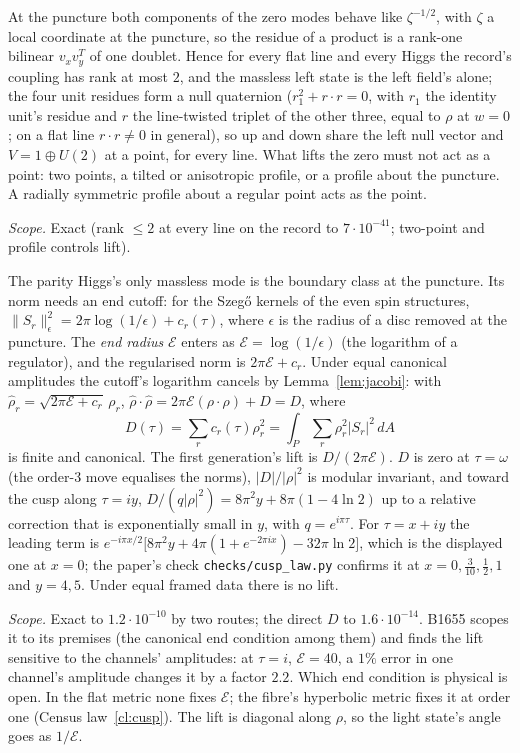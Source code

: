 \begin{proposition}\label{prop:rank}
At the puncture both components of the zero modes behave like $\zeta^{-1/2}$, with $\zeta$ a local coordinate at the puncture, so the residue of a product is a rank-one
bilinear $v_xv_y^T$ of one doublet. Hence for every flat line and every Higgs the record's coupling has rank at most $2$,
and the massless left state is the left field's alone; the four unit residues form a null quaternion
($r_1^2+r\cdot r=0$, with $r_1$ the identity unit's residue and $r$ the line-twisted triplet of the other three, equal to
$\rho$ at $w=0$; on a flat line $r\cdot r\neq0$ in general), so up and down share the left null vector and $V=1\oplus U(2)$ at a point, for every line.
What lifts the zero must not act as a point: two points, a tilted or anisotropic profile, or a profile about the
puncture. A radially symmetric profile about a regular point acts as the point.
\end{proposition}
\noindent\emph{Scope.} Exact (rank $\le2$ at every line on the record to $7\cdot10^{-41}$; two-point and profile controls lift).

\begin{proposition}\label{prop:norm}
The parity Higgs's only massless mode is the boundary class at the puncture. Its norm needs an end cutoff: for the
Szegő kernels of the even spin structures, $\|S_r\|^2_\epsilon=2\pi\log(1/\epsilon)+c_r(\tau)$, where $\epsilon$ is the
radius of a disc removed at the puncture. The \emph{end radius} $\mathcal E$ enters as $\mathcal E=\log(1/\epsilon)$ (the logarithm of a
regulator), and the regularised norm is $2\pi\mathcal E+c_r$. Under equal canonical amplitudes the cutoff's logarithm
cancels by Lemma~\ref{lem:jacobi}: with $\hat\rho_r=\sqrt{2\pi\mathcal E+c_r}\,\rho_r$,
$\hat\rho\cdot\hat\rho=2\pi\mathcal E(\rho\cdot\rho)+D=D$, where
\[
  D(\tau)=\sum_r c_r(\tau)\rho_r^2=\int_{P}\sum_r\rho_r^2|S_r|^2\,dA
\]
is finite and canonical. The first generation's lift is $D/(2\pi\mathcal E)$. $D$ is zero at $\tau=\omega$ (the order-3 move equalises
the norms), $|D|/|\rho|^2$ is modular invariant, and toward the cusp along $\tau=iy$, $D/(q|\rho|^2)=8\pi^2y+8\pi(1-4\ln2)$ up to a relative correction that is
exponentially small in $y$, with $q=e^{i\pi\tau}$. For $\tau=x+iy$ the leading term is
$e^{-i\pi x/2}\bigl[8\pi^2y+4\pi(1+e^{-2\pi ix})-32\pi\ln2\bigr]$, which is the displayed one at $x=0$; the paper's check
\texttt{checks/cusp\_law.py} confirms it at $x=0,\tfrac3{10},\tfrac12,1$ and $y=4,5$.
Under equal framed data there is no lift.
\end{proposition}
\noindent\emph{Scope.} Exact to $1.2\cdot10^{-10}$ by two routes; the direct $D$ to $1.6\cdot10^{-14}$. B1655 scopes it to its
premises (the canonical end condition among them) and finds the lift sensitive to the channels' amplitudes: at $\tau=i$,
$\mathcal E=40$, a $1\%$ error in one channel's amplitude changes it by a factor $2.2$. Which end condition is physical is open. In the flat metric none fixes $\mathcal E$; the fibre's
hyperbolic metric fixes it at order one (Census law~\ref{cl:cusp}). The lift is diagonal along $\rho$, so the light state's angle goes as $1/\mathcal E$.

